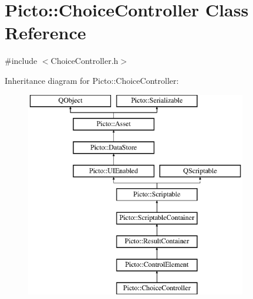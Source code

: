 \hypertarget{class_picto_1_1_choice_controller}{\section{Picto\-:\-:Choice\-Controller Class Reference}
\label{class_picto_1_1_choice_controller}
}


{\ttfamily \#include $<$Choice\-Controller.\-h$>$}

Inheritance diagram for Picto\-:\-:Choice\-Controller\-:\begin{figure}[H]
\begin{center}
\leavevmode
\includegraphics[height=9.000000cm]{class_picto_1_1_choice_controller}
\end{center}
\end{figure}
